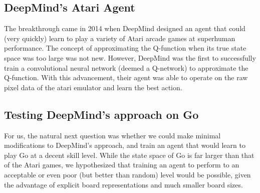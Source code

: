 \subsection{DeepMind's Atari Agent}
The breakthrough came in 2014 when DeepMind designed an agent that could (very quickly) learn to play a variety of Atari arcade games at superhuman performance. The concept of approximating the Q-function when its true state space was too large was not new. However, DeepMind was the first to successfully train a convolutional neural network (deemed a Q-network) to approximate the Q-function. With this advancement, their agent was able to operate on the raw pixel data of the atari emulator and learn the best action.

\subsection{Testing DeepMind's approach on Go}
For us, the natural next question was whether we could make minimal modifications to DeepMind's approach, and train an agent that would learn to play Go at a decent skill level. While the state space of Go is far larger than that of the Atari games, we hypothesized that training an agent to perform to an acceptable or even poor (but better than random) level would be possible, given the advantage of explicit board representations and much smaller board sizes.